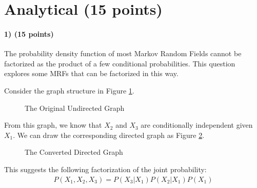 \documentclass[11pt]{article}
\newcommand{\ztnodesize}{.6}
\begin{document}
\section{Analytical (15 points)}
	
\paragraph{1) (15 points)} The probability density function of most Markov Random Fields cannot be factorized as the product of a few conditional probabilities. This question explores some MRFs that can be factorized in this way.

Consider the graph structure in Figure \ref{fig:utm1}.
\begin{figure}[h]
	\begin{center}
		\caption{The Original Undirected Graph}
			\label{fig:utm1}
		\end{center}
\end{figure}
From this graph, we know that $X_2$ and $X_3$ are conditionally independent given $X_1$. We can draw the corresponding directed graph as Figure \ref{fig:dtm2}.
\begin{figure}[h]
	\begin{center}
		\caption{The Converted Directed Graph}
			\label{fig:dtm2}
		\end{center}
\end{figure}
This suggests the following factorization of the joint probability:
\begin{eqnarray}
P(X_1, X_2, X_3) = P(X_3 | X_1) P(X_2 | X_1) P(X_1) \nonumber
\end{eqnarray}
\end{document}
